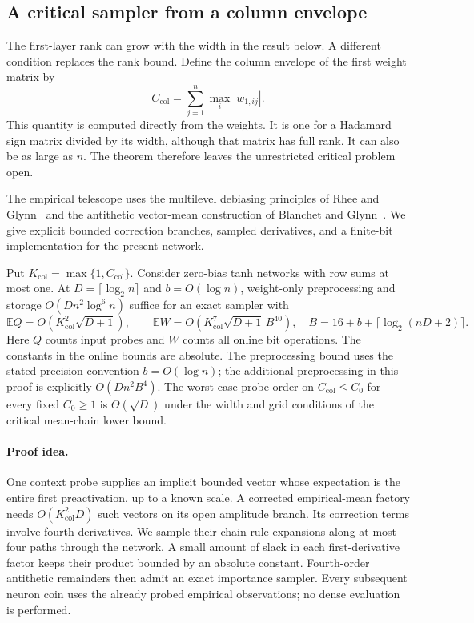 \subsection{A critical sampler from a column envelope}
\label{sec:column-envelope}

The first-layer rank can grow with the width in the result below.  A
different condition replaces the rank bound.  Define the column envelope
of the first weight matrix by
\[
 C_{\mathrm{col}}=\sum_{j=1}^n\max_i|w_{1,ij}|.
\]
This quantity is computed directly from the weights.  It is one for a
Hadamard sign matrix divided by its width, although that matrix has full
rank.  It can also be as large as $n$.  The theorem therefore leaves the
unrestricted critical problem open.

The empirical telescope uses the multilevel debiasing principles of
Rhee and Glynn~\cite{rheeglynn2015} and the antithetic vector-mean
construction of Blanchet and Glynn~\cite{blanchetglynn2015}.
We give explicit bounded correction branches, sampled derivatives,
and a finite-bit implementation for the present network.

\begin{theorem}
\label{thm:column-envelope-critical}
Put $K_{\mathrm{col}}=\max\{1,C_{\mathrm{col}}\}$.
Consider zero-bias tanh networks with row sums at most one.  At
$D=\lceil\log_2 n\rceil$ and $b=O(\log n)$, weight-only preprocessing
and storage $O(Dn^2\log^6 n)$ suffice for an exact sampler with
\[
 \mathbb E Q=O(K_{\mathrm{col}}^2\sqrt{D+1}),\qquad
 \mathbb E W=O(K_{\mathrm{col}}^7\sqrt{D+1}\,B^{40}),
 \quad B=16+b+\lceil\log_2(nD+2)\rceil.
\]
Here $Q$ counts input probes and $W$ counts all online bit operations.
The constants in the online bounds are absolute.  The preprocessing
bound uses the stated precision convention $b=O(\log n)$; the
additional preprocessing in this proof is explicitly $O(Dn^2B^4)$.
The worst-case probe order on $C_{\mathrm{col}}\le C_0$ for every
fixed $C_0\ge1$ is
$\Theta(\sqrt D)$ under the width and grid conditions of the critical
mean-chain lower bound.
\end{theorem}

\paragraph{Proof idea.}
One context probe supplies an implicit bounded vector whose expectation
is the entire first preactivation, up to a known scale.  A corrected
empirical-mean factory needs $O(K_{\mathrm{col}}^2D)$ such vectors
on its open amplitude branch.  Its correction terms involve fourth derivatives.
We sample their chain-rule expansions along at most four paths through
the network.  A small amount of slack in each first-derivative factor
keeps their product bounded by an absolute constant.  Fourth-order
antithetic remainders then admit an exact importance sampler.  Every
subsequent neuron coin uses the already probed empirical observations;
no dense evaluation is performed.

